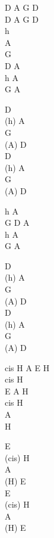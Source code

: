 \begin{chord}
D A G D\\
D A G D\\
h\\
A\\
G\\
D A\\
h A\\
G A

D\\
(h) A\\
G\\
(A) D\\
D\\
(h) A\\
G\\
(A) D

h A\\
G D A\\
h A\\
G A

D\\
(h) A\\
G\\
(A) D\\
D\\
(h) A\\
G\\
(A) D

cis H A E H\\
cis H \\
E A H\\
cis H\\
A\\
H

E\\
(cis) H\\
A\\
(H) E\\
E\\
(cis) H\\
A\\
(H) E
\end{chord}
